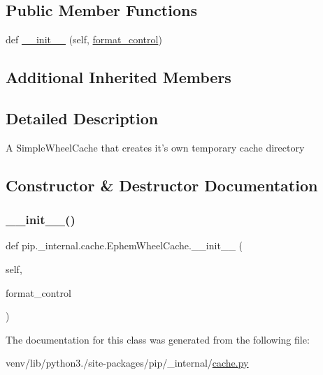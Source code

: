 \subsection*{Public Member Functions}
\begin{DoxyCompactItemize}
\item 
def \hyperlink{classpip_1_1__internal_1_1cache_1_1EphemWheelCache_a0ed7d7884254cab14288c30ec528e147}{\+\_\+\+\_\+init\+\_\+\+\_\+} (self, \hyperlink{classpip_1_1__internal_1_1cache_1_1Cache_ac6051e5c3dff9ba7c7e5968e82acc9d2}{format\+\_\+control})
\end{DoxyCompactItemize}
\subsection*{Additional Inherited Members}


\subsection{Detailed Description}
\begin{DoxyVerb}A SimpleWheelCache that creates it's own temporary cache directory
\end{DoxyVerb}
 

\subsection{Constructor \& Destructor Documentation}
\mbox{\label{classpip_1_1__internal_1_1cache_1_1EphemWheelCache_a0ed7d7884254cab14288c30ec528e147}} 
\subsubsection{\texorpdfstring{\+\_\+\+\_\+init\+\_\+\+\_\+()}{\_\_init\_\_()}}
{\footnotesize\ttfamily def pip.\+\_\+internal.\+cache.\+Ephem\+Wheel\+Cache.\+\_\+\+\_\+init\+\_\+\+\_\+ (\begin{DoxyParamCaption}\item[{}]{self,  }\item[{}]{format\+\_\+control }\end{DoxyParamCaption})}



The documentation for this class was generated from the following file\+:\begin{DoxyCompactItemize}
\item 
venv/lib/python3./site-\/packages/pip/\+\_\+internal/\hyperlink{__internal_2cache_8py}{cache.\+py}\end{DoxyCompactItemize}
